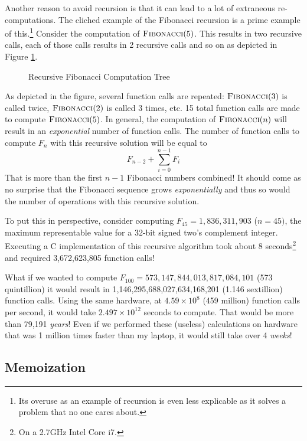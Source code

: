 Another reason to avoid recursion is that it can lead to a lot of
extraneous re-computations.  The cliched example of the Fibonacci
recursion is a prime example of this.\footnote{Its overuse as
an example of recursion is even less explicable as it solves a problem
that no one cares about.}  Consider the computation of 
$\textsc{Fibonacci}(5)$.  This results in two recursive calls, each of
those calls results in 2 recursive calls and so on as depicted in 
Figure \ref{figure:fibonacciTree}.

\begin{figure}
\centering

\caption{Recursive Fibonacci Computation Tree}
\label{figure:fibonacciTree}
\end{figure}

As depicted in the figure, several function calls are repeated: 
$\textsc{Fibonacci}(3)$ is called twice, $\textsc{Fibonacci}(2)$
is called 3 times, etc.  15 total function calls are made to
compute $\textsc{Fibonacci}(5)$.  In general, the computation
of $\textsc{Fibonacci}(n)$ will result in an \emph{exponential}
number of function calls.  The number of function calls
to compute $F_n$ with this recursive solution will be equal to 
  $$F_{n-2} + \sum_{i=0}^{n-1} F_{i}$$ 
That is more than the first $n-1$ Fibonacci numbers combined!
It should come as no surprise that the Fibonacci sequence
grows \emph{exponentially} and thus so would the number of 
operations with this recursive solution.

To put this in perspective, consider computing $F_{45} = 1,836,311,903$ 
($n = 45)$, the maximum representable value for a 32-bit signed two's
complement integer.  Executing a C implementation of this recursive
algorithm took about 8 seconds\footnote{On a 2.7GHz Intel Core i7.} 
and required 3,672,623,805 function calls!

What if we wanted to compute $F_{100} = 573,147,844,013,817,084,101$ 
(573 quintillion) it would result in 1,146,295,688,027,634,168,201 
(1.146 sextillion) function calls.  Using the same hardware, at 
$4.59\times 10^8$ (459 million) function calls per second, it would
take $2.497 \times 10^{12}$ seconds to compute.  That would be more than
79,191 \emph{years}!  Even if we performed these (useless) calculations
on hardware that was 1 million times faster than my laptop, it would
still take over 4 \emph{weeks}!

\subsection{Memoization}

